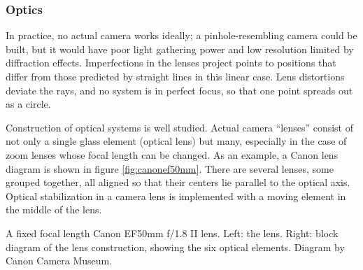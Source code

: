 
\subsubsection{Optics} %


In practice, no actual camera works ideally; a pinhole-resembling camera could be built, but it would have poor light gathering power and low resolution limited by diffraction effects. \cite{todo}
Imperfections in the lenses project points to positions that differ from those predicted by straight lines in this linear case.
Lens distortions deviate the rays, and no system is in perfect focus, so that one point spreads out as a circle.

Construction of optical systems is well studied. \cite{kingslake1989history}
Actual camera ``lenses'' consist of not only a single glass element (optical lens) but many, especially in the case of zoom lenses whose focal length can be changed.
As an example, a Canon lens diagram is shown in figure \ref{fig:canonef50mm}.
There are several lenses, some grouped together, all aligned so that their centers lie parallel to the optical axis.
Optical stabilization in a camera lens is implemented with a moving element in the middle of the lens.


{A fixed focal length Canon EF50mm f/1.8 II lens. Left: the lens. Right: block diagram of the lens construction, showing the six optical elements. Diagram by Canon Camera Museum.}


